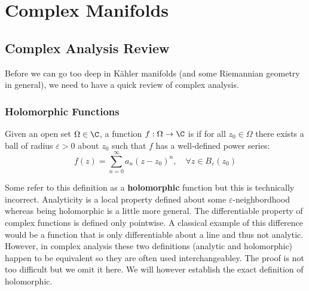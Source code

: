 \section{Complex Manifolds}

\subsection{Complex Analysis Review}
Before we can go too deep in Kähler manifolds (and some Riemannian geometry in
general), we need to have a quick review of complex analysis.

\subsubsection{Holomorphic Functions}

\begin{definition}\label{def 3.1}
    Given an open set $\Omega \in \C$, a function $f: \Omega \to \C$ is 
    if for all $z_0 \in \Omega$ there exists a ball of radius $\varepsilon>0$ about
    $z_0$ such that $f$ has a well-defined power series:
    \begin{equation*}
        f(z) = \sum_{n=0}^\infty a_n (z-z_0)^n, \quad \forall z \in B_\varepsilon
        (z_0)
    \end{equation*}
\end{definition}

Some refer to this definition as a \textbf{holomorphic} function but this is technically
incorrect. Analyticity is a local property defined about some $\varepsilon$-neighbordhood
whereas being holomorphic is a little more general. The differentiable property of
complex functions is defined only pointwise. A classical example of this difference
would be a function that is only differentiable about a line and thus not analytic. 
However, in complex analysis these two definitions (analytic and holomorphic) happen
to be equivalent so they are often used interchangeabley. The proof is not too difficult
but we omit it here. We will however establish the exact definition of holomorphic.

